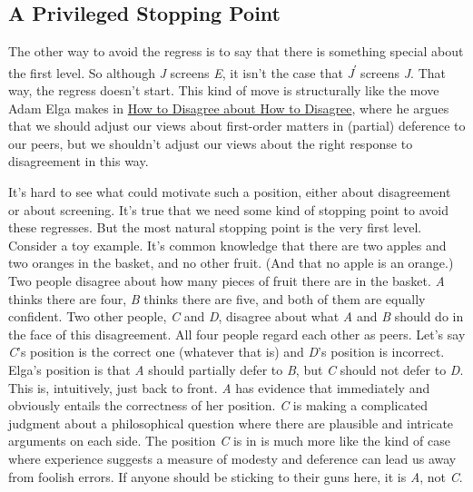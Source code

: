 \documentclass[
  10pt,
  letterpaper,
  DIV=11,
  numbers=noendperiod,
  twoside]{scrartcl}
\begin{document}
\subsection{A Privileged Stopping
Point}\label{a-privileged-stopping-point}

The other way to avoid the regress is to say that there is something
special about the first level. So although \emph{J} screens \emph{E}, it
isn't the case that \emph{J}\textsuperscript{ʹ} screens \emph{J}. That
way, the regress doesn't start. This kind of move is structurally like
the move Adam Elga makes in
\href{http://philsci-archive.pitt.edu/archive/00003702/}{How to Disagree
about How to Disagree}, where he argues that we should adjust our views
about first-order matters in (partial) deference to our peers, but we
shouldn't adjust our views about the right response to disagreement in
this way.

It's hard to see what could motivate such a position, either about
disagreement or about screening. It's true that we need some kind of
stopping point to avoid these regresses. But the most natural stopping
point is the very first level. Consider a toy example. It's common
knowledge that there are two apples and two oranges in the basket, and
no other fruit. (And that no apple is an orange.) Two people disagree
about how many pieces of fruit there are in the basket. \emph{A} thinks
there are four, \emph{B} thinks there are five, and both of them are
equally confident. Two other people, \emph{C} and \emph{D}, disagree
about what \emph{A} and \emph{B} should do in the face of this
disagreement. All four people regard each other as peers. Let's say
\emph{C}'s position is the correct one (whatever that is) and \emph{D}'s
position is incorrect. Elga's position is that \emph{A} should partially
defer to \emph{B}, but \emph{C} should not defer to \emph{D}. This is,
intuitively, just back to front. \emph{A} has evidence that immediately
and obviously entails the correctness of her position. \emph{C} is
making a complicated judgment about a philosophical question where there
are plausible and intricate arguments on each side. The position
\emph{C} is in is much more like the kind of case where experience
suggests a measure of modesty and deference can lead us away from
foolish errors. If anyone should be sticking to their guns here, it is
\emph{A}, not \emph{C}.
\end{document}
